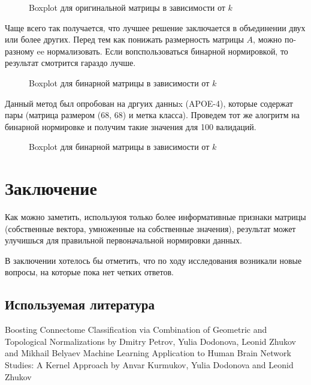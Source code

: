 \documentclass{urticle}
\begin{document}
\begin{figure}[H]
	\caption{Boxplot для оригинальной матрицы в зависимости от $k$}
	\label{f1}
\end{figure}

Чаще всего так получается, что лучшее решение заключается в объединении двух или более других. Перед тем как понижать размерность матрицы $A$, можно по-разному ee нормализовать.
Если вопспользоваться бинарной нормировкой, то результат смотрится гараздо лучше.
\begin{figure}[H]
	\noindent{}
	\caption{Boxplot для бинарной матрицы в зависимости от $k$}
	\label{f}
\end{figure}

Данный метод был опробован на дргуих данныx (APOE-4), которые содержат пары (матрица размером (68, 68) и метка класса). Проведем тот же алогритм на бинарной нормировке и получим такие значения для 100 валидаций.

\begin{figure}[H]
	\noindent{}
	\caption{Boxplot для бинарной матрицы в зависимости от $k$}
	\label{f3}
\end{figure}


\section*{Заключение}
Как можно заметить, используюя только более информативные признаки матрицы (собственные вектора, умноженные на собственные значения), результат может улучишься для правильной первоначальной нормировки данных.

В заключении хотелось бы отметить, что по ходу исследования возникали новые вопросы, на которые пока нет четких ответов.

\subsection*{Используемая литература}
\begin{thebibliography}{2}
 Boosting Connectome Classification via Combination of Geometric and Topological Normalizations by Dmitry Petrov, Yulia Dodonova, Leonid Zhukov and Mikhail Belyaev
 Machine Learning Application to Human Brain Network Studies: A Kernel Approach by Anvar Kurmukov, Yulia Dodonova and Leonid Zhukov 
\end{thebibliography}
\end{document}
